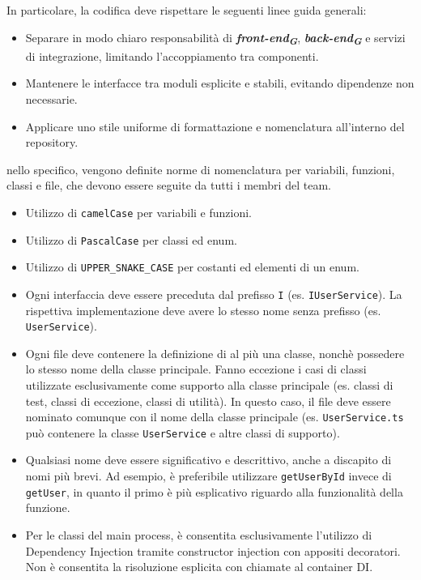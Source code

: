 \documentclass[a4paper,12pt]{article}
\newcommand{\glossario}[1]{\textit{#1}\textsubscript{\textbf{\textit{\textcolor{lightblack}{G}}}}}
\begin{document}
In particolare, la codifica deve rispettare le seguenti linee guida generali:
\begin{itemize}
        \item Separare in modo chiaro responsabilità di \textbf{\glossario{front-end}}, \textbf{\glossario{back-end}} e servizi di integrazione, limitando l'accoppiamento tra componenti.
        \item Mantenere le interfacce tra moduli esplicite e stabili, evitando dipendenze non necessarie.
        \item Applicare uno stile uniforme di formattazione e nomenclatura all'interno del repository.
\end{itemize}

nello specifico, vengono definite norme di nomenclatura per variabili, funzioni, classi e file, che devono essere seguite da tutti i membri del team.
\begin{itemize}
    \item Utilizzo di \texttt{camelCase} per variabili e funzioni.
    \item Utilizzo di \texttt{PascalCase} per classi ed enum.
    \item Utilizzo di \texttt{UPPER\_SNAKE\_CASE} per costanti ed elementi di un enum.
    \item Ogni interfaccia deve essere preceduta dal prefisso \texttt{I} (es. \texttt{IUserService}). La rispettiva implementazione deve avere lo stesso nome senza prefisso (es. \texttt{UserService}).
    \item Ogni file deve contenere la definizione di al più una classe, nonchè possedere lo stesso nome della classe principale. Fanno eccezione i casi di classi utilizzate esclusivamente come supporto alla classe principale (es. classi di test, classi di eccezione, classi di utilità). In questo caso, il file deve essere nominato comunque con il nome della classe principale (es. \texttt{UserService.ts} può contenere la classe \texttt{UserService} e altre classi di supporto).
    \item Qualsiasi nome deve essere significativo e descrittivo, anche a discapito di nomi più brevi. Ad esempio, è preferibile utilizzare \texttt{getUserById} invece di \texttt{getUser}, in quanto il primo è più esplicativo riguardo alla funzionalità della funzione.
    \item Per le classi del main process, è consentita esclusivamente l'utilizzo di Dependency Injection tramite constructor injection con appositi decoratori. Non è consentita la risoluzione esplicita con chiamate al container DI.
\end{itemize}
\end{document}
